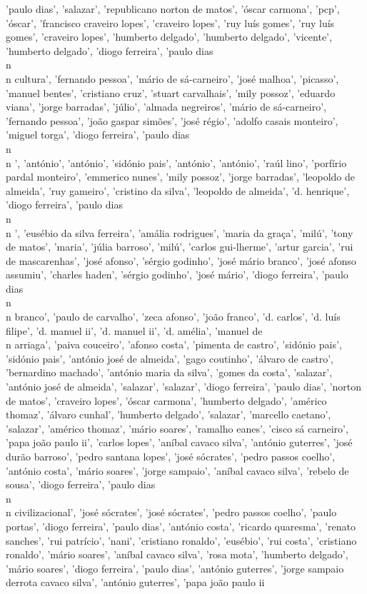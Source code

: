 \documentclass{article}
\begin{document}
\begin{itemize}
'paulo dias', 'salazar', 'republicano norton de matos', 'óscar carmona', 'pcp', 'óscar', 'francisco craveiro lopes', 'craveiro lopes', 'ruy luís gomes', 'ruy luís gomes', 'craveiro lopes', 'humberto delgado', 'humberto delgado', 'vicente', 'humberto delgado', 'diogo ferreira', 'paulo dias\\n\\n cultura', 'fernando pessoa', 'mário de sá-carneiro', 'josé malhoa', 'picasso', 'manuel bentes', 'cristiano cruz', 'stuart carvalhais', 'mily possoz', 'eduardo viana', 'jorge barradas', 'júlio', 'almada negreiros', 'mário de sá-carneiro', 'fernando pessoa', 'joão gaspar simões', 'josé régio', 'adolfo casais monteiro', 'miguel torga', 'diogo ferreira', 'paulo dias\\n\\n ', 'antónio', 'antónio', 'sidónio pais', 'antónio', 'antónio', 'raúl lino', 'porfírio pardal monteiro', 'emmerico nunes', 'mily possoz', 'jorge barradas', 'leopoldo de almeida', 'ruy gameiro', 'cristino da silva', 'leopoldo de almeida', 'd. henrique', 'diogo ferreira', 'paulo dias\\n\\n ', 'eusébio da silva ferreira', 'amália rodrigues', 'maria da graça', 'milú', 'tony de matos', 'maria', 'júlia barroso', 'milú', 'carlos gui-lherme', 'artur garcia', 'rui de mascarenhas', 'josé afonso', 'sérgio godinho', 'josé mário branco', 'josé afonso assumiu', 'charles haden', 'sérgio godinho', 'josé mário', 'diogo ferreira', 'paulo dias\\n\\n branco', 'paulo de carvalho', 'zeca afonso', 'joão franco', 'd. carlos', 'd. luís filipe', 'd. manuel ii', 'd. manuel ii', 'd. amélia', 'manuel de\\n arriaga', 'paiva couceiro', 'afonso costa', 'pimenta de castro', 'sidónio pais', 'sidónio pais', 'antónio josé de almeida', 'gago coutinho', 'álvaro de castro', 'bernardino machado', 'antónio maria da silva', 'gomes da costa', 'salazar', 'antónio josé de almeida', 'salazar', 'salazar', 'diogo ferreira', 'paulo dias', 'norton de matos', 'craveiro lopes', 'óscar carmona', 'humberto delgado', 'américo thomaz', 'álvaro cunhal', 'humberto delgado', 'salazar', 'marcello caetano', 'salazar', 'américo thomaz', 'mário soares', 'ramalho eanes', 'cisco sá carneiro', 'papa joão paulo ii', 'carlos lopes', 'aníbal cavaco silva', 'antónio guterres', 'josé durão barroso', 'pedro santana lopes', 'josé sócrates', 'pedro passos coelho', 'antónio costa', 'mário soares', 'jorge sampaio', 'aníbal cavaco silva', 'rebelo de sousa', 'diogo ferreira', 'paulo dias\\n\\n civilizacional', 'josé sócrates', 'josé sócrates', 'pedro passos coelho', 'paulo portas', 'diogo ferreira', 'paulo dias', 'antónio costa', 'ricardo quaresma', 'renato sanches', 'rui patrício', 'nani', 'cristiano ronaldo', 'eusébio', 'rui costa', 'cristiano ronaldo', 'mário soares', 'aníbal cavaco silva', 'rosa mota', 'humberto delgado', 'mário soares', 'diogo ferreira', 'paulo dias', 'antónio guterres', 'jorge sampaio derrota cavaco silva', 'antónio guterres', 'papa joão paulo ii 
\end{itemize}
\end{document}
